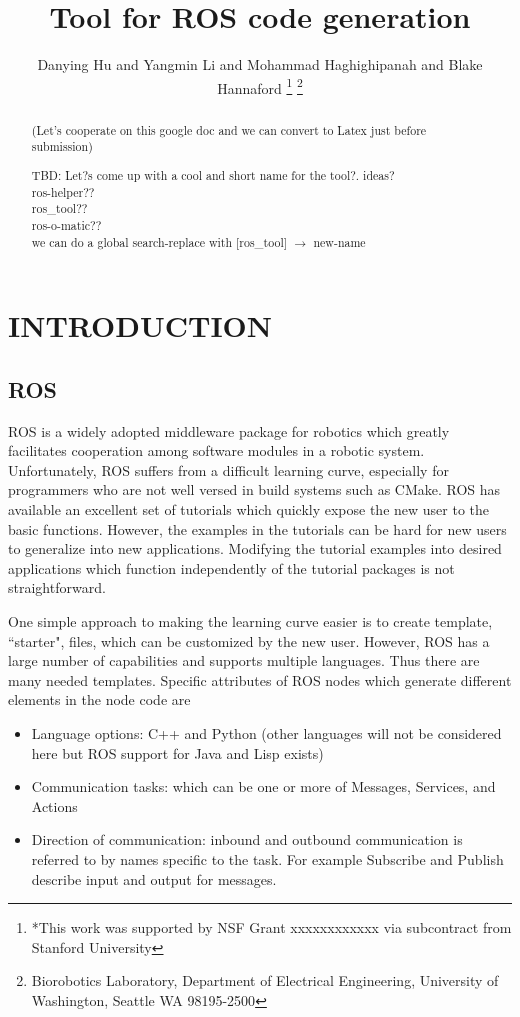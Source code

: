 \documentclass[letterpaper, 10 pt, conference]{ieeeconf}  %
\title{\LARGE \bf
Tool for ROS code generation
}
\author{Danying Hu and Yangmin Li and Mohammad Haghighipanah and Blake Hannaford%
\thanks{*This work was  supported by NSF Grant xxxxxxxxxxxx  via subcontract from Stanford University}%
\thanks{Biorobotics Laboratory, Department of Electrical Engineering, University of Washington, Seattle WA 98195-2500}%
}
\begin{document}
\maketitle
\thispagestyle{empty}
\pagestyle{empty}


\begin{abstract}


(Let's cooperate on this google doc and we can convert to Latex just before submission)

TBD:   Let?s come up with a cool and short name for the tool?. ideas?\\
   ros-helper??\\
   ros\_tool??\\
   ros-o-matic??\\

we can do a global search-replace with  [ros\_tool] $\to$ new-name
 
 \vspace{2.0in}

\end{abstract}


\section{INTRODUCTION}
\subsection{ROS}
ROS\cite{xxxxx} is a widely adopted middleware package for robotics which greatly facilitates cooperation among software modules in a robotic system.   Unfortunately, ROS suffers from a difficult learning curve, especially for programmers who are not well versed in build systems such as CMake.   
ROS has available an excellent set of tutorials\cite{RosTutorialsWWW} which quickly expose the new user to the basic functions.  However, the examples in the tutorials can be hard for new users to generalize into new applications.  Modifying the tutorial examples into desired applications which function independently of the tutorial packages is not straightforward. 

One simple approach to making the learning curve easier is to create template, ``starter", files, which can be customized by the new user.  However, ROS has a large number of capabilities and supports multiple languages.  Thus there are many needed templates.   Specific attributes of ROS nodes which generate different elements in the node code are
\begin{itemize}
  \item Language options: C++ and Python (other languages will not be considered here but ROS support for Java and Lisp exists)
  \item Communication tasks: which can be one or more of Messages, Services, and Actions 
  \item Direction of communication: inbound and outbound communication is referred to by names specific to the task. For example 
  Subscribe and Publish  describe input and output  for messages. 
\end{itemize}
\end{document}
